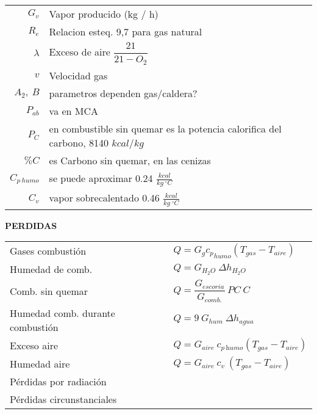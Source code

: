 \documentclass[11pt,a4paper]{article}
\begin{document}
	\begin{cajita}
		
		\begin{multicols}{2}
			\begin{tabular}{r  p{7cm} }
				$G_{v}$ & Vapor producido (kg / h)\\
				$R_{e}$& Relacion esteq. 9,7 para gas natural\\
				$\lambda$& Exceso de aire $\dfrac{21}{21-O_{2}}$\\
				$v$ & Velocidad gas\\
				$A_{2},\ B$& parametros dependen gas/caldera?\\
				$P_{ab}$ & va en MCA\\
				$P_C$& en combustible sin quemar es la potencia calorifica del carbono, 8140 $kcal/kg$\\
				$\% C$ & es Carbono sin quemar, en las cenizas\\
				$C_{p~humo}$ & se puede aproximar 0.24 $\frac{kcal}{kg~^{\circ} C}$\\
				$C_{v}$ & vapor sobrecalentado  0.46 $\frac{kcal}{kg~^{\circ} C}$
			\end{tabular}
		\vspace{0.4cm}
	
			\renewcommand{\arraystretch}{1.5}
	
			\textbf{PERDIDAS}\\
	
			\begin{tabular}{p{} l}
				Gases combustión & $Q = G_{g} {c_{p}}_{humo} (T_{gas} - T_{aire})$\\
				Humedad de comb. & $ Q = G_{H_2O}\ \Delta h_{H_2O}$\\
				Comb. sin quemar & $ Q = \dfrac{G_{escoria}}{G_{comb.}}\ PC\ C$\\
				Humedad comb. durante combustión & $Q = 9\ G_{hum} ~\Delta h_{agua}$\\
				Exceso aire & $Q = G_{aire}~c_{p~\textit{humo}} (T_{gas} - T_{aire})$\\
				Humedad aire & $ Q = G_{aire}~ c_{v} ~ (T_{gas} - T_{aire})$\\
				Pérdidas por radiación & \\
				Pérdidas circunstanciales & \\
			\end{tabular}
			

\end{multicols}
\end{cajita}
\end{document}
